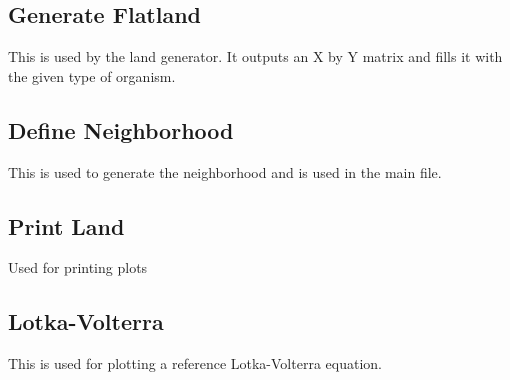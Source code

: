 \documentclass[11pt]{article}
\begin{document}
\subsection{Generate Flatland}
This is used by the land generator. It outputs an X by Y matrix and fills it with the given type of organism.

\subsection{Define Neighborhood}
This is used to generate the neighborhood and is used in the main file.

\subsection{Print Land}
Used for printing plots

\subsection{Lotka-Volterra}
This is used for plotting a reference Lotka-Volterra equation.





\end{document}
